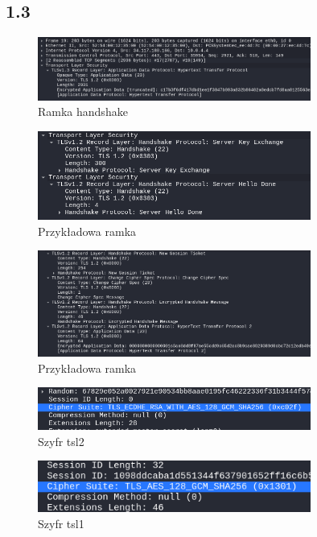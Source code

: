 \documentclass{article}
\begin{document}
\subsection*{1.3}
\begin{figure}[H]
  \centering
  \includegraphics[width=0.8\textwidth]{5_przykladtsl.png}
  \caption{Ramka handshake}
\end{figure}
\begin{figure}[H]
  \centering
  \includegraphics[width=0.8\textwidth]{5_przykladtsl2.png}
  \caption{Przykładowa ramka}
\end{figure}
\begin{figure}[H]
  \centering
  \includegraphics[width=0.8\textwidth]{5_przykladtslwiecej.png}
  \caption{Przykładowa ramka}
\end{figure}
\begin{figure}[H]
  \centering
  \includegraphics[width=0.8\textwidth]{6_tls2_szyfr.png}
  \caption{Szyfr tsl2}
\end{figure}
\begin{figure}[H]
  \centering
  \includegraphics[width=0.8\textwidth]{6_tls3_szyfr.png}
  \caption{Szyfr tsl1}
\end{figure}
\end{document}
